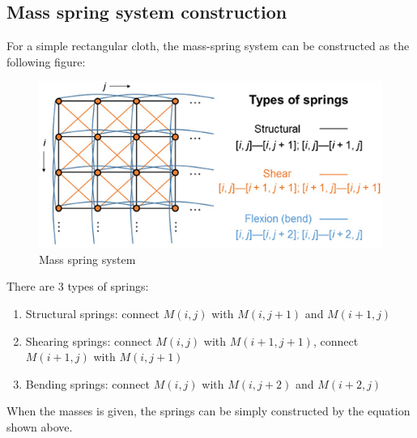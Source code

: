 \documentclass[acmtog]{acmart}
\begin{document}
\subsection{Mass spring system construction}
For a simple rectangular cloth, the mass-spring system can be constructed as the following 
figure:
\begin{figure}[H]
	\centering
	\includegraphics[scale=0.4]{./img2.png}
	\caption{Mass spring system}
\end{figure}
There are 3 types of springs:\\
\begin{enumerate}
	\item Structural springs: connect $M(i,j)$ with $M(i, j+1)$ and $M(i+1,j)$
	\item Shearing springs: connect $M(i,j)$ with $M(i+1, j+1)$, connect $M(i+1,j)$ with $M(i,j+1)$
	\item Bending springs:  connect $M(i,j)$ with $M(i, j+2)$ and $M(i+2,j)$
\end{enumerate}
When the masses is given, the springs can be simply constructed by the equation shown above.
\end{document}
